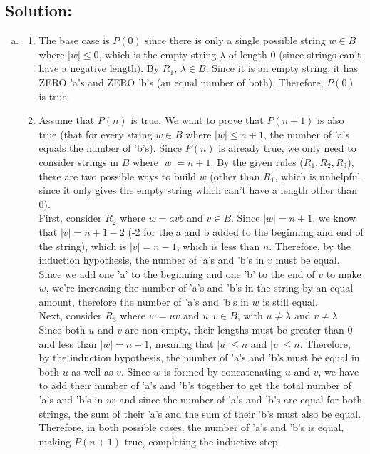 \documentclass[12pt]{article}
\begin{document}
	\subsection*{\textbf{Solution:}}
	\begin{enumerate}[(a)]
		\item
			\begin{enumerate}
				\item[(ii)] The base case is $P(0)$ since there is only a single possible
					string $w \in B$ where $|w| \leq 0$, which is the empty string
					$\lambda$ of length $0$ (since strings can't have a negative length). By
					$R_{1}$, $\lambda \in B$. Since it is an empty string, it has ZERO 'a's
					and ZERO 'b's (an equal number of both). Therefore, $P(0)$ is true.

				\item[(iii)] Assume that $P(n)$ is true. We want to prove that $P(n+1)$
					is also true (that for every string $w \in B$ where $|w| \leq n+1$,
					the number of 'a's equals the number of 'b's). Since $P(n)$ is already
					true, we only need to consider strings in $B$ where $|w|=n+1$. By the
					given rules ($R_{1},R_{2},R_{3}$), there are two possible ways to build
					$w$ (other than $R_{1}$, which is unhelpful since it only gives the empty
					string which can't have a length other than $0$). \\
					First, consider $R_{2}$ where $w=avb$ and $v \in B$. Since $|w|=n+1$,
					we know that $|v|=n+1-2$ (-2 for the a and b added to the beginning
					and end of the string), which is $|v|=n-1$, which is less than $n$.
					Therefore, by the induction hypothesis, the number of 'a's and 'b's in
					$v$ must be equal. Since we add one 'a' to the beginning and one 'b' to
					the end of $v$ to make $w$, we're increasing the number of 'a's and 'b's
					in the string by an equal amount, therefore the number of 'a's and 'b's
					in $w$ is still equal. \\
					Next, consider $R_{3}$ where $w=uv$ and $u,v \in B$, with
					$u\neq\lambda$ and $v\neq\lambda$. Since both $u$ and $v$ are non-empty,
					their lengths must be greater than $0$ and less than $|w|=n+1$, meaning
					that $|u|\leq n$ and $|v|\leq n$. Therefore, by the induction hypothesis,
					the number of 'a's and 'b's must be equal in both $u$ as well as $v$. Since
					$w$ is formed by concatenating $u$ and $v$, we have to add their
					number of 'a's and 'b's together to get the total number of 'a's and 'b's
					in $w$; and since the number of 'a's and 'b's are equal for both strings,
					the sum of their 'a's and the sum of their 'b's must also be equal. \\
					Therefore, in both possible cases, the number of 'a's and 'b's is equal,
					making $P(n+1)$ true, completing the inductive step.
			\end{enumerate}


\end{enumerate}
\end{document}
